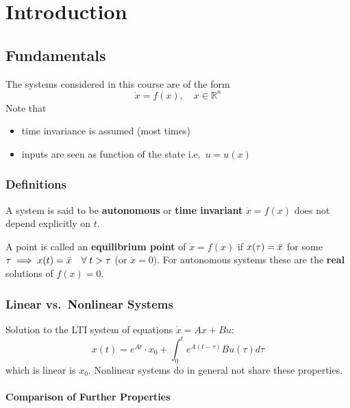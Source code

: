 \section{Introduction}
\subsection{Fundamentals}
The systems considered in this course are of the form
\noindent\begin{equation*}
    \boxed{\dot{x} = f(x), \quad x\in \mathbb{R}^n}
\end{equation*}
Note that
\begin{itemize}
    \item time invariance is assumed (most times)
    \item inputs are seen as function of the state i.e.\ $u=u(x)$
\end{itemize}

\subsubsection{Definitions}

A system is said to be \textbf{autonomous} or \textbf{time invariant} $\dot{x} = f(x)$ does not depend explicitly on $t$.

A point is called an \textbf{equilibrium point} of $\dot{x} = f(x)$ if $x(\tau) = \Bar{x}$ for some $\tau \implies x(t) = \Bar{x} \quad \forall \; t>\tau$ (or $\dot{x} = 0$). For autonomous systems these are the \textbf{real} solutions of $f(x)=0$.

\subsubsection{Linear vs.\ Nonlinear Systems}


Solution to the LTI system of equations $\dot{x} = Ax + Bu$:
\noindent\begin{equation*}
    x(t) = e^{At}\cdot x_0 + \int_0^t e^{A(t-\tau)} Bu(\tau) d\tau
\end{equation*}
which is linear is $x_0$. Nonlinear systems do in general not share these properties.

\paragraph{Comparison of Further Properties}

\newpar{}

